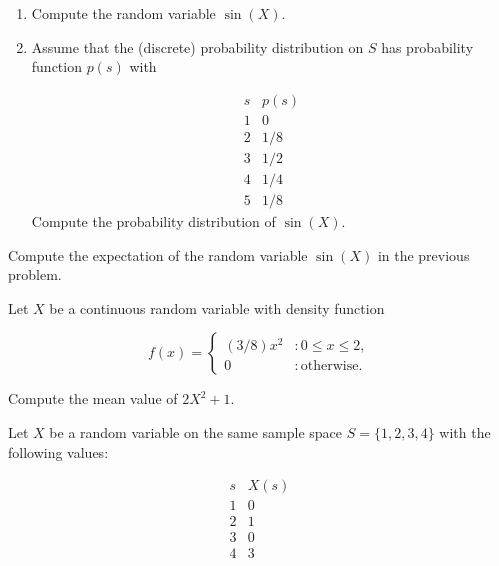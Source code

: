 \documentclass[12pt,reqno]{amsart}
\begin{document}
\medskip
\begin{enumerate}
\item Compute the random variable $\sin{(X)}$.\vfill
\item Assume that the (discrete) probability distribution on $S$ has probability function $p(s)$ with

	\[
	\begin{array}{c|c}
	s & p(s)  \\ \hline
	1 & 0  \\
	2 & 1/8  \\
	3 & 1/2 \\
	4 & 1/4 \\
	5 & 1/8
	\end{array}
	\]
Compute the probability distribution of $\sin(X)$.\vfill
\end{enumerate}
















\newpage
\prob Compute the expectation of the random variable $\sin(X)$ in the previous problem.\vfill













\bigskip
\prob Let $X$ be a continuous random variable with density function
	
	\[
	f(x) = \begin{cases}
	(3/8)x^2 & : 0 \leq x \leq 2, \\
	0 & : \text{otherwise}.
	\end{cases}
	\]

Compute the mean value of $2X^2+1$.\vfill















\bigskip
\prob Let $X$ be a random variable on the same sample space $S = \{1,2,3,4\}$ with the following values:

	\[
	\begin{array}{c|c}
	s & X(s)  \\ \hline
	1 & 0  \\
	2 & 1  \\
	3 & 0 \\
	4 & 3
	\end{array}
	\]
\end{document}
